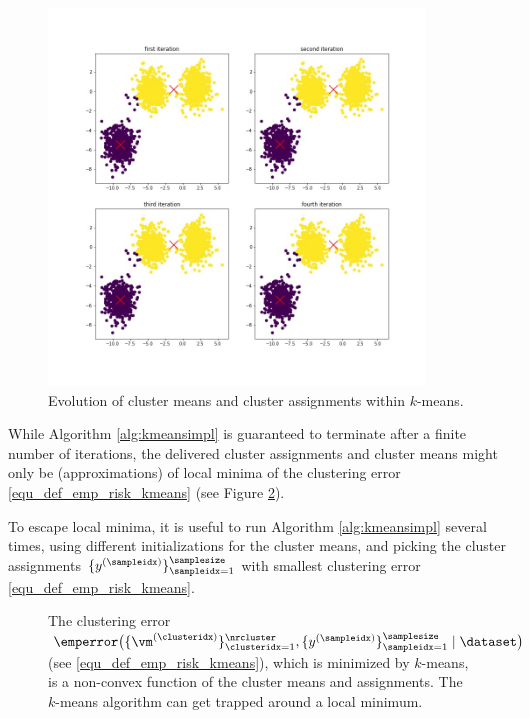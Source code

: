 \documentclass[12pt]{report}
\begin{document}
\begin{figure}[htbp]
\begin{center}
\includegraphics[width=10cm]{EvolKmeans.jpg}  
\vspace*{-6mm}
\end{center}
\caption{Evolution of cluster means and cluster assignments within $k$-means.}
\label{fig:first_iter_kmeans}
\end{figure}

While Algorithm \ref{alg:kmeansimpl} is guaranteed to terminate after a 
finite number of iterations, the delivered cluster assignments and cluster 
means might only be (approximations) of local minima of the clustering error 
\eqref{equ_def_emp_risk_kmeans} (see Figure \ref{fig_emp_risk_k_means}). 

To escape local minima, it is useful to run Algorithm \ref{alg:kmeansimpl} 
several times, using different initializations for the cluster means, 
and picking the cluster assignments $\{ y^{(\sampleidx)} \}_{\sampleidx=1}^{\samplesize}$ 
with smallest clustering error \eqref{equ_def_emp_risk_kmeans}. 

\begin{figure}[htbp]
\begin{center}
\end{center}
\caption{The clustering error $\emperror \big( \{\vm^{(\clusteridx)}\}_{\clusteridx=1}^{\nrcluster},\{y^{(\sampleidx)}\}_{\sampleidx=1}^{\samplesize} \mid \dataset \big)$ (see \eqref{equ_def_emp_risk_kmeans}), 
which is minimized by $k$-means, is a non-convex function of 
the cluster means and assignments. The $k$-means algorithm 
can get trapped around a local minimum.} \label{fig_emp_risk_k_means}
\end{figure}
\end{document}
